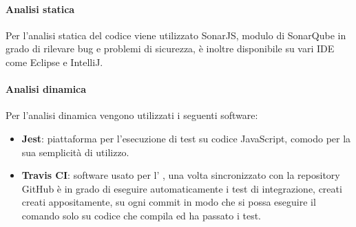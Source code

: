 \paragraph{Analisi statica} \Spazio
Per l'analisi statica del codice  viene utilizzato SonarJS, modulo di SonarQube in grado di rilevare bug e problemi di sicurezza, è inoltre disponibile su vari IDE come Eclipse e IntelliJ.
\paragraph{Analisi dinamica} \Spazio
Per l'analisi dinamica vengono utilizzati i seguenti software:
\begin{itemize}
	\item  \textbf{Jest}: piattaforma per l'esecuzione di test su codice JavaScript, comodo per la sua semplicità di utilizzo.
	\item \textbf{Travis CI}: software usato per l' , una volta sincronizzato con la repository GitHub è in grado di eseguire automaticamente i test di integrazione, creati creati appositamente, su ogni commit in modo che si possa eseguire il comando  solo su codice che compila ed ha passato i test.
\end{itemize}
